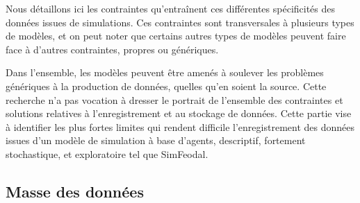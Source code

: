 Nous détaillons ici les contraintes qu'entraînent ces différentes spécificités des données issues de simulations.
Ces contraintes sont transversales à plusieurs types de modèles, et on peut noter que certains autres types de modèles peuvent faire face à d'autres contraintes, propres ou génériques.

Dans l'ensemble, les modèles peuvent être amenés à soulever les problèmes génériques à la production de données, quelles qu'en soient la source.
Cette recherche n'a pas vocation à dresser le portrait de l'ensemble des contraintes et solutions relatives à l'enregistrement et au stockage de données.
Cette partie vise à identifier les plus fortes limites qui rendent difficile l'enregistrement des données issues d'un modèle de simulation à base d'agents, descriptif, fortement stochastique, et exploratoire tel que SimFeodal.


\subsection{Masse des données}




